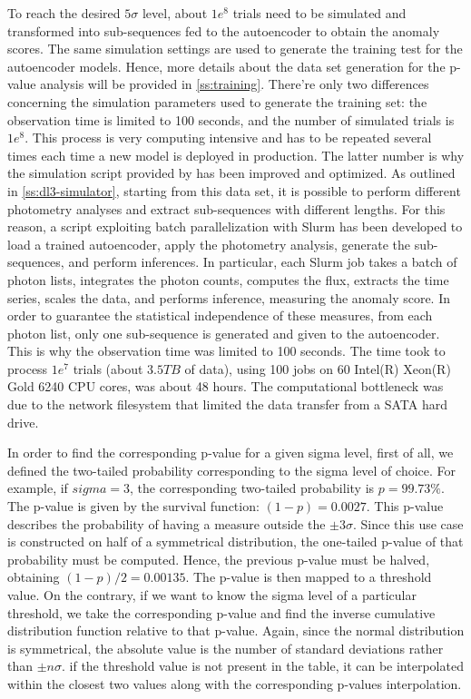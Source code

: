 To reach the desired $5\sigma$ level, about $1e^8$ trials need to be simulated and transformed into sub-sequences fed to the autoencoder to obtain the anomaly scores. The same simulation settings are used to generate the training test for the autoencoder models. Hence, more details about the data set generation for the p-value analysis will be provided in \autoref{ss:training}. There're only two differences concerning the simulation parameters used to generate the training set: the observation time is limited to 100 seconds, and the number of simulated trials is $1e^8$. This process is very computing intensive and has to be repeated several times each time a new model is deployed in production. The latter number is why the simulation script provided by \cite{dipiano2022ctasagsci} has been improved and optimized. As outlined in \autoref{ss:dl3-simulator}, starting from this data set, it is possible to perform different photometry analyses and extract sub-sequences with different lengths. For this reason, a script exploiting batch parallelization with Slurm has been developed to load a trained autoencoder, apply the photometry analysis, generate the sub-sequences, and perform inferences. In particular, each Slurm job takes a batch of photon lists, integrates the photon counts, computes the flux, extracts the time series, scales the data, and performs inference, measuring the anomaly score. In order to guarantee the statistical independence of these measures, from each photon list, only one sub-sequence is generated and given to the autoencoder. This is why the observation time was limited to 100 seconds. The time took to process $1e^7$ trials (about $3.5 TB$ of data), using 100 jobs on 60 Intel(R) Xeon(R) Gold 6240 CPU  cores, was about 48 hours. The computational bottleneck was due to the network filesystem that limited the data transfer from a SATA hard drive. 

In order to find the corresponding p-value for a given sigma level, first of all, we defined the two-tailed probability corresponding to the sigma level of choice. For example, if $sigma=3$, the corresponding two-tailed probability is $p=99.73\%$. The p-value is given by the survival function: $(1-p)=0.0027$. This p-value describes the probability of having a measure outside the  $\pm3\sigma$. Since this use case is constructed on half of a symmetrical distribution, the one-tailed p-value of that probability must be computed. Hence, the previous p-value must be halved, obtaining $(1-p)/2=0.00135$. The p-value is then mapped to a threshold value. On the contrary, if we want to know the sigma level of a particular threshold, we take the corresponding p-value and find the inverse cumulative distribution function relative to that p-value. Again, since the normal distribution is symmetrical, the absolute value is the number of standard deviations rather than  $\pm n\sigma$. if the threshold value is not present in the table, it can be interpolated within the closest two values along with the corresponding p-values interpolation.  

